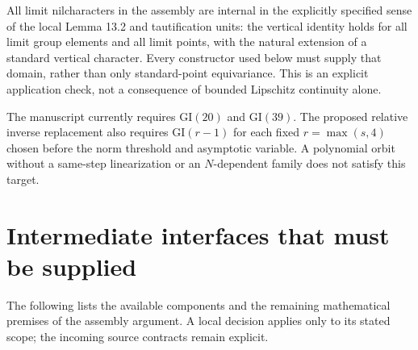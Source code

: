\documentclass[11pt]{article}
\newcommand{\GI}{\mathrm{GI}}
\begin{document}
All limit nilcharacters in the assembly are internal in the explicitly
specified sense of the local Lemma 13.2 and tautification units: the
vertical identity holds for all limit group elements and all limit points,
with the natural extension of a standard vertical character. Every
constructor used below must supply that domain, rather than only
standard-point equivariance. This is an explicit application check, not a
consequence of bounded Lipschitz continuity alone.

The manuscript currently requires $\GI(20)$ and $\GI(39)$. The proposed
relative inverse replacement also requires $\GI(r-1)$ for each fixed
$r=\max(s,4)$ chosen before the norm threshold and asymptotic variable.
A polynomial orbit without a same-step linearization or an
$N$-dependent family does not satisfy this target.

\section{Intermediate interfaces that must be supplied}

The following lists the available components and the remaining
mathematical premises of the assembly argument. A local decision applies
only to its stated scope; the incoming source contracts remain explicit.
\end{document}
